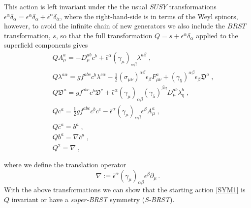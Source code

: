 \begin{appendix}
\noindent This action is left invariant under the the usual $SUSY$ transformations $\epsilon^{\alpha}\delta_{\alpha} = \epsilon^{\alpha}\delta_{\alpha} + \bar{\epsilon}^{\dot{\alpha}}\bar{\delta}_{\dot{\alpha}}$, where the right-hand-side is in terms of the Weyl spinors, however, to avoid the infinite chain of new generators we also include the $BRST$ transformation, $s$, so that the full transformation $Q=s+\epsilon^{\alpha}\delta_{\alpha}$ applied to the superfield components gives
\begin{eqnarray}
\label{susytransf1}
&&
QA^{a}_{\mu} = - D^{ab}_{\mu}c^{b} 
+\bar{\epsilon}^\alpha(\gamma_\mu)_{\alpha\beta}\lambda^{a\beta}\;,\nonumber \\
&&
Q\lambda^{a\alpha} = gf^{abc}c^{b}\lambda^{c\alpha}
- \frac{1}{2}(\sigma_{\mu\nu})^{\alpha\beta}\epsilon_{\beta} F_{\mu\nu}^{a}
+ (\gamma_{5})^{\alpha\beta}\epsilon_{\beta} \mathfrak{D}^a\;, \nonumber \\
&&
Q\mathfrak{D}^a = gf^{abc}c^{b}\mathfrak{D}^c 
+ \bar{\epsilon}^{\alpha}(\gamma_{\mu})_{\alpha\beta}(\gamma_{5})^{\beta\eta}D_{\mu}^{ab}\lambda^{b}_{\eta} \;, \\
&&
Qc^{a} = \frac{1}{2}gf^{abc}c^{b}c^{c} 
- \bar{\epsilon}^{\alpha}(\gamma_{\mu})_{\alpha\beta}\epsilon^{\beta} A^{a}_{\mu}\;, \nonumber \\
&&
Q\bar{c}^{a} = b^{a}\;, \nonumber \\
&&
Qb^{a} = \nabla\bar{c}^{a}\;, \nonumber\\
&&
Q^{2}=\nabla\;,
\end{eqnarray}



where we define the translation operator 
\begin{equation}
\label{top1}%
\nabla := \bar{\epsilon}^{\alpha}(\gamma_{\mu})_{\alpha\beta}\epsilon^{\beta} \partial_{\mu}\,.
\end{equation}
With the above transformations we can show that the starting action \eqref{SYM1} is $Q$ invariant or have a {\it super-BRST} symmetry ({\it S-BRST}).



\end{appendix}
